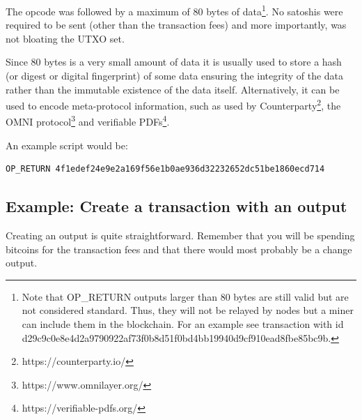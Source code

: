 The  opcode was followed by a maximum of 80 bytes of data\footnote{Note that OP\_RETURN outputs larger than 80 bytes are still valid but are not considered standard. Thus, they will not be relayed by nodes but a miner can include them in the blockchain. For an example see transaction with id d29c9c0e8e4d2a9790922af73f0b8d51f0bd4bb19940d9cf910ead8fbe85bc9b.}. No satoshis were required to be sent (other than the transaction fees) and more importantly,  was not bloating the UTXO set.

Since 80 bytes is a very small amount of data it is usually used to store a hash (or digest or digital fingerprint) of some data ensuring the integrity of the data rather than the immutable existence of the data itself. Alternatively, it can be used to encode meta-protocol information, such as used by Counterparty\footnote{https://counterparty.io/}, the OMNI protocol\footnote{https://www.omnilayer.org/} and verifiable PDFs\footnote{https://verifiable-pdfs.org/}.%

An example script would be:

\begin{emphbox}
\begin{lstlisting}[style=Pseudomath]
OP_RETURN 4f1edef24e9e2a169f56e1b0ae936d32232652dc51be1860ecd714
\end{lstlisting}
\end{emphbox}


\subsection*{Example: Create a transaction with an  output}
Creating an  output is quite straightforward. Remember that you will be spending bitcoins for the transaction fees and that there would most probably be a change output.


